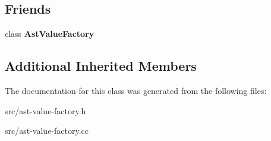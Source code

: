 \subsection*{Friends}
\begin{DoxyCompactItemize}
\item 
\hypertarget{classv8_1_1internal_1_1_ast_cons_string_a1d507e13f196677ce9bdd7b29efd96c0}{}class {\bfseries Ast\+Value\+Factory}\label{classv8_1_1internal_1_1_ast_cons_string_a1d507e13f196677ce9bdd7b29efd96c0}

\end{DoxyCompactItemize}
\subsection*{Additional Inherited Members}


The documentation for this class was generated from the following files\+:\begin{DoxyCompactItemize}
\item 
src/ast-\/value-\/factory.\+h\item 
src/ast-\/value-\/factory.\+cc\end{DoxyCompactItemize}
